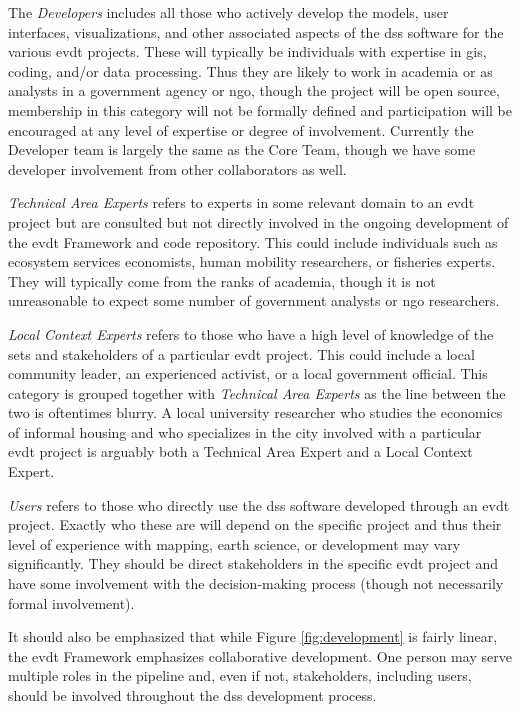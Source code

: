 The \textit{Developers} includes all those who actively develop the models, user interfaces, visualizations, and other associated aspects of the \ac{dss} software for the various \ac{evdt} projects. These will typically be individuals with expertise in \ac{gis}, coding, and/or data processing. Thus they are likely to work in academia or as analysts in a government agency or \ac{ngo}, though the project will be open source, membership in this category will not be formally defined and participation will be encouraged at any level of expertise or degree of involvement. Currently the Developer team is largely the same as the Core Team, though we have some developer involvement from other collaborators as well.

\textit{Technical Area Experts} refers to experts in some relevant domain to an \ac{evdt} project but are consulted but not directly involved in the ongoing development of the \ac{evdt} Framework and code repository. This could include individuals such as ecosystem services economists, human mobility researchers, or fisheries experts. They will typically come from the ranks of academia, though it is not unreasonable to expect some number of government analysts or \ac{ngo} researchers.

\textit{Local Context Experts} refers to those who have a high level of knowledge of the \ac{sets} and stakeholders of a particular \ac{evdt} project. This could include a local community leader, an experienced activist, or a local government official. This category is grouped together with \textit{Technical Area Experts} as the line between the two is oftentimes blurry. A local university researcher who studies the economics of informal housing and who specializes in the city involved with a particular \ac{evdt} project is arguably both a Technical Area Expert and a Local Context Expert.

\textit{Users} refers to those who directly use the \ac{dss} software developed through an \ac{evdt} project. Exactly who these are will depend on the specific project and thus their level of experience with mapping, earth science, or development may vary significantly. They should be direct stakeholders in the specific \ac{evdt} project and have some involvement with the decision-making process (though not necessarily formal involvement). 

It should also be emphasized that while Figure \ref{fig:development} is fairly linear, the \ac{evdt} Framework emphasizes collaborative development. One person may serve multiple roles in the pipeline and, even if not, stakeholders, including users, should be involved throughout the \ac{dss} development process.

